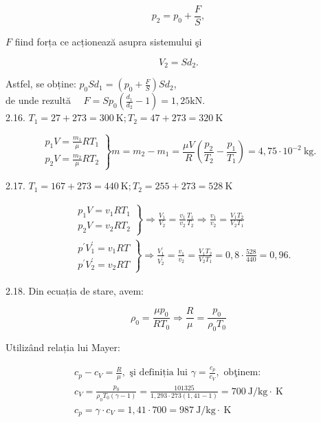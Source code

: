 \documentclass[10pt]{article}
\begin{document}
$$
p_{2}=p_{0}+\frac{F}{S},
$$

$F$ fiind forța ce acționează asupra sistemului şi

$$
V_{2}=S d_{2} .
$$

Astfel, se obține: $p_{0} S d_{1}=\left(p_{0}+\frac{F}{S}\right) S d_{2}$,\\
de unde rezultă $\quad F=S p_{0}\left(\frac{d_{1}}{d_{2}}-1\right)=1,25 \mathrm{kN}$.\\
2.16. $T_{1}=27+273=300 \mathrm{~K} ; T_{2}=47+273=320 \mathrm{~K}$

$$
\left.\begin{array}{l}
p_{1} V=\frac{m_{1}}{\mu} R T_{1} \\
p_{2} V=\frac{m_{2}}{\mu} R T_{2}
\end{array}\right\} m=m_{2}-m_{1}=\frac{\mu V}{R}\left(\frac{p_{2}}{T_{2}}-\frac{p_{1}}{T_{1}}\right)=4,75 \cdot 10^{-2} \mathrm{~kg} .
$$

2.17. $T_{1}=167+273=440 \mathrm{~K} ; T_{2}=255+273=528 \mathrm{~K}$

$$
\begin{aligned}
& \left.\begin{array}{l}
p_{1} V=v_{1} R T_{1} \\
p_{2} V=v_{2} R T_{2}
\end{array}\right\} \Rightarrow \frac{V_{1}}{V_{2}}=\frac{v_{1}}{v_{2}} \frac{T_{1}}{T_{2}} \Rightarrow \frac{v_{1}}{v_{2}}=\frac{V_{1} T_{2}}{V_{2} T_{1}} \\
& \left.\begin{array}{l}
p^{\prime} V_{1}^{\prime}=v_{1} R T \\
p^{\prime} V_{2}^{\prime}=v_{2} R T
\end{array}\right\} \Rightarrow \frac{V_{1}^{\prime}}{V_{2}^{\prime}}=\frac{v_{1}}{v_{2}}=\frac{V_{1} T_{2}}{V_{2} T_{1}}=0,8 \cdot \frac{528}{440}=0,96 .
\end{aligned}
$$

2.18. Din ecuația de stare, avem:

$$
\rho_{0}=\frac{\mu p_{0}}{R T_{0}} \Rightarrow \frac{R}{\mu}=\frac{p_{0}}{\rho_{0} T_{0}}
$$

Utilizând relația lui Mayer:

$$
\begin{gathered}
c_{p}-c_{V}=\frac{R}{\mu}, \text { şi definiția lui } \gamma=\frac{c_{p}}{c_{V}}, \text { obţinem: } \\
c_{V}=\frac{p_{0}}{\rho_{0} T_{0}(\gamma-1)}=\frac{101325}{1,293 \cdot 273(1,41-1)}=700 \mathrm{~J} / \mathrm{kg} \cdot \mathrm{~K} \\
c_{p}=\gamma \cdot c_{V}=1,41 \cdot 700=987 \mathrm{~J} / \mathrm{kg} \cdot \mathrm{~K}
\end{gathered}
$$
\end{document}
